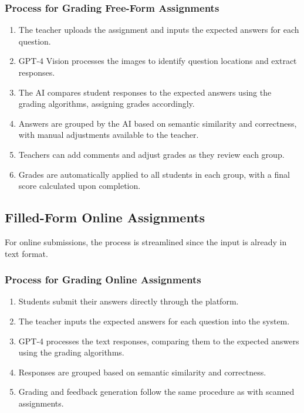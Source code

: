 \documentclass[ms,twoside,print]{nuthesis}
\begin{document}
\subsubsection{Process for Grading Free-Form Assignments}

\begin{enumerate}
    \item The teacher uploads the assignment and inputs the expected answers for each question.
    \item GPT-4 Vision processes the images to identify question locations and extract responses.
    \item The AI compares student responses to the expected answers using the grading algorithms, assigning grades accordingly.
    \item Answers are grouped by the AI based on semantic similarity and correctness, with manual adjustments available to the teacher.
    \item Teachers can add comments and adjust grades as they review each group.
    \item Grades are automatically applied to all students in each group, with a final score calculated upon completion.
\end{enumerate}

\subsection{Filled-Form Online Assignments}

For online submissions, the process is streamlined since the input is already in text format.

\subsubsection{Process for Grading Online Assignments}

\begin{enumerate}
    \item Students submit their answers directly through the platform.
    \item The teacher inputs the expected answers for each question into the system.
    \item GPT-4 processes the text responses, comparing them to the expected answers using the grading algorithms.
    \item Responses are grouped based on semantic similarity and correctness.
    \item Grading and feedback generation follow the same procedure as with scanned assignments.
\end{enumerate}
\end{document}
